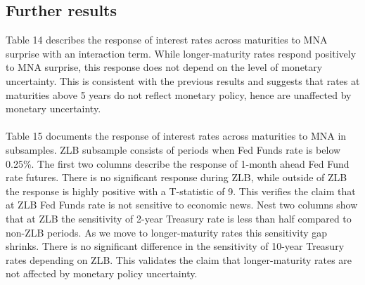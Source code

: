 \documentclass[12pt]{article}
\begin{document}
\subsection{Further results} 
\label{sec:Model}

Table 14 describes the response of interest rates across maturities to MNA surprise with an interaction term. While longer-maturity rates respond positively to MNA surprise, this response does not depend on the level of monetary uncertainty. This is consistent with the previous results and suggests that rates at maturities above 5 years do not reflect monetary policy, hence are unaffected by monetary uncertainty.
\paragraph{}
Table 15 documents the response of interest rates across maturities to MNA in subsamples. ZLB subsample consists of periods when Fed Funds rate is below 0.25\%. The first two columns describe the response of 1-month ahead Fed Fund rate futures. There is no significant response during ZLB, while outside of ZLB the response is highly positive with a T-statistic of 9. This verifies the claim that at ZLB Fed Funds rate is not sensitive to economic news. Nest two columns show that at ZLB the sensitivity of 2-year Treasury rate is less than half compared to non-ZLB periods. As we move to longer-maturity rates this sensitivity gap shrinks. There is no significant difference in the sensitivity of 10-year Treasury rates depending on ZLB. This validates the claim that longer-maturity rates are not affected by monetary policy uncertainty.
\end{document}
